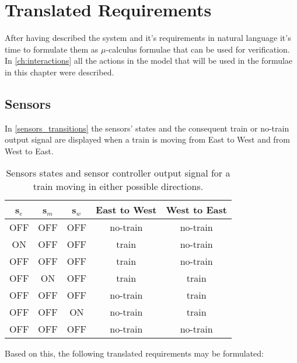 \documentclass[final]{report}
\begin{document}
\chapter{Translated Requirements}
After having described the system and it's requirements in natural language it's time to formulate them as $\mu$-calculus formulae that can be used for verification. In \cref{ch:interactions} all the actions in the model that will be used in the formulae in this chapter were described.

\section{Sensors}
In \cref{sensors_transitions} the sensors' states and the consequent train or no-train output signal are displayed when a train is moving from East to West and from West to East.
\begin{table}[H]
\centering
\begin{tabular}{|c|c|c|c|c|}
\hline 
s$_{e}$ & s$_{m}$ & s$_{w}$ & East to West & West to East \\ 
\hline 
OFF & OFF & OFF & no-train & no-train \\ 
\hline 
ON & OFF & OFF & train & no-train \\ 
\hline 
OFF & OFF & OFF & train & no-train \\ 
\hline 
OFF & ON & OFF & train & train \\ 
\hline 
OFF & OFF & OFF & no-train & train \\ 
\hline 
OFF & OFF & ON & no-train & train \\ 
\hline 
OFF & OFF & OFF & no-train & no-train \\ 
\hline 
\end{tabular} 
\caption{Sensors states and sensor controller output signal for a train moving in either possible directions.}
\label{tb:sensors_transitions}
\end{table}
Based on this, the following translated requirements may be formulated: 
\end{document}
